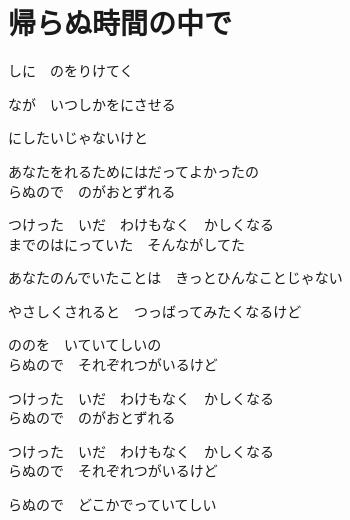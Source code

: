 \section{ 帰らぬ時間の中で}
\large{

しに　のをりけてく

なが　いつしかをにさせる

にしたいじゃないけと

あなたをれるためにはだってよかったの
\\

らぬので　のがおとずれる

つけった　いだ　わけもなく　かしくなる
\\

までのはにっていた　そんながしてた

あなたのんでいたことは　きっとひんなことじゃない

やさしくされると　つっばってみたくなるけど

ののを　いていてしいの
\\

らぬので　それぞれつがいるけど

つけった　いだ　わけもなく　かしくなる
\\

らぬので　のがおとずれる

つけった　いだ　わけもなく　かしくなる
\\

らぬので　それぞれつがいるけど

らぬので　どこかでっていてしい

}